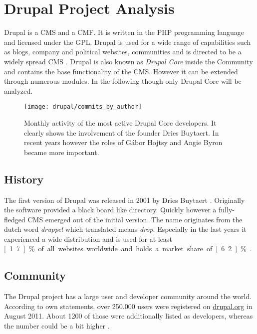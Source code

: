 \section{Drupal Project Analysis} %


Drupal is a \ac{CMS} and a \ac{CMF}. It is written in the PHP programming
language and licensed under the \ac{GPL}. Drupal is used for a wide range of
capabilities such as blogs, company and political websites, communities and is
directed to be a widely spread \ac{CMS} \cite{DrupalOverview}. Drupal is also
known as \emph{Drupal Core} inside the Community and contains the base
functionality of the \ac{CMS}. However it can be extended through numerous
modules. In the following though only Drupal Core will be analyzed.

\begin{figure}[htbp]
  \centering
  \texttt{[image: drupal/commits\_by\_author]}
  \caption[Commits by Most Active Authors, Drupal]
  {Monthly activity of the most active Drupal Core developers. It clearly shows
    the involvement of the founder Dries Buytaert. In recent years however the
    roles of Gábor Hojtsy and Angie Byron became more important.}
  \label{fig:drupal:cba}
\end{figure}

\subsection{History} %

The first version of Drupal was released in 2001 by Dries Buytaert
\cite{DrupalHistory}. Originally the software provided a black board like
directory. Quickly however a fully-fledged \ac{CMS} emerged out of the initial
version. The name originates from the dutch word \emph{druppel} which
translated means \emph{drop}. Especially in the last years it
experienced a wide distribution and is used for at least \unit[1.7]{\%} of all
websites worldwide and holds a market share of \unit[6.2]{\%}
\cite{DrupalBuiltWith,DrupalW3Techs}.


\subsection{Community} %

The Drupal project has a large user and developer community around the world.
According to own statements, over 250.000 users were registered on
\url{drupal.org} in August 2011. About 1200 of those were additionally listed
as developers, whereas the number could be a bit higher \cite{DrupalBuytaert}.

